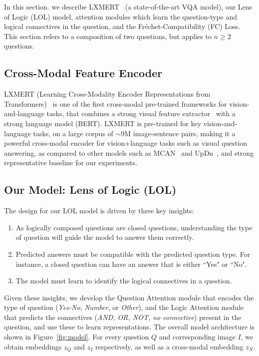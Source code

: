 In this section. we describe LXMERT~\citep{tan2019lxmert} (a state-of-the-art VQA model), our Lens of Logic (LOL) model, attention modules which learn the question-type and logical connectives in the question, and the Fréchet-Compatibility (FC) Loss.
This section refers to a composition of two questions, but applies to $n\geq2$ questions.

    \subsection{Cross-Modal Feature Encoder}
    LXMERT (Learning Cross-Modality Encoder Representations from Transformers)~\citep{tan2019lxmert} is one of the first cross-modal pre-trained frameworks for vision-and-language tasks, that combines a strong visual feature extractor~\citep{ren2015faster} with a strong language model (BERT)\citep{devlin2018bert}.
    LXMERT is pre-trained for key vision-and-language tasks, on a large corpus of $\sim$9M image-sentence pairs, making it a powerful cross-modal encoder for vision+language tasks such as visual question answering, as compared to other models such as MCAN~\citep{Yu_2019_CVPR} and UpDn~\citep{Anderson2017up-down}, and strong representative baseline for our experiments.


    \subsection{Our Model: Lens of Logic (LOL)}
    The design for our LOL model is driven by three key insights:
    \begin{enumerate}[noitemsep]
        \item As logically composed questions are closed questions, understanding the type of question will guide the model to answer them correctly.
        \item Predicted answers must be compatible with the predicted question type. For instance, a closed question can have an answer that is either ``Yes" or ``No".
        \item The model must learn to identify the logical connectives in a question.
    \end{enumerate}

    \noindent Given these insights, we develop the Question Attention module that encodes the type of question (\textit{Yes-No}, \textit{Number}, or \textit{Other}), and the Logic Attention module that predicts the connectives (\textit{AND, OR, NOT, no connective}) present in the question, and use these to learn representations.
    The overall model architecture is shown in Figure~\ref{fig:model}.
    For every question $Q$ and corresponding image $I$, we obtain embeddings $z_Q$ and $z_I$ respectively, as well as a cross-modal embedding $z_X$. 


